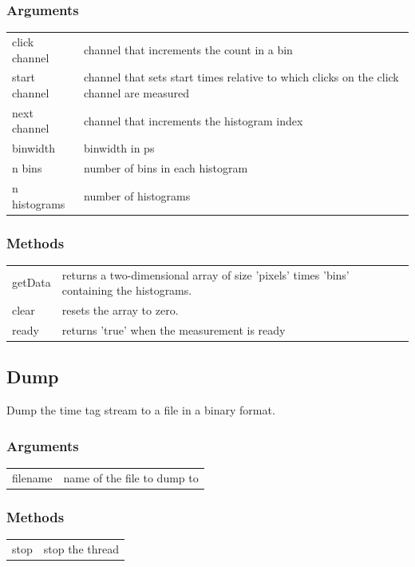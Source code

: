 \documentclass[oneside]{memoir}
\begin{document}
\subsubsection{Arguments}
\begin{tabular}{p{}p{}}
  click channel & channel that increments the count in a bin\\
  start channel & channel that sets start times relative to which clicks on the click channel are measured\\
  next channel & channel that increments the histogram index\\
  binwidth & binwidth in ps\\
  n bins & number of bins in each histogram\\
  n histograms & number of histograms\\
\end{tabular}

\subsubsection{Methods}
\begin{tabular}{p{}p{}}
  getData & returns a two-dimensional array of size 'pixels' times 'bins' containing the histograms.\\
  clear & resets the array to zero.\\
  ready & returns 'true' when the measurement is ready\\
\end{tabular}

\subsection[*]{Dump}

Dump the time tag stream to a file in a binary format.

\subsubsection{Arguments}
\begin{tabular}{p{}p{}}
  filename & name of the file to dump to\\
\end{tabular}

\subsubsection{Methods}
\begin{tabular}{p{}p{}}
  stop & stop the thread\\
\end{tabular}
\end{document}
